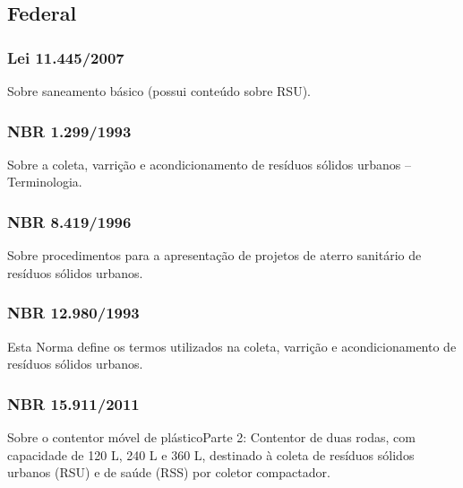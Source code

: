 \begin{subapend}
	\subsection{Federal}
	\begin{subsubapend}
		\subsubsection{Lei 11.445/2007}
		Sobre saneamento básico (possui conteúdo sobre RSU).
		\subsubsection{NBR 1.299/1993}
		Sobre a coleta, varrição e acondicionamento de resíduos sólidos urbanos – Terminologia.
		\subsubsection{NBR 8.419/1996}
		Sobre procedimentos para a apresentação de projetos de aterro sanitário de resíduos sólidos urbanos.
		\subsubsection{NBR 12.980/1993}
		Esta Norma define os termos utilizados na coleta, varrição e acondicionamento de resíduos sólidos urbanos.
		\subsubsection{NBR 15.911/2011}
		Sobre o contentor móvel de plásticoParte 2: Contentor de duas rodas, com capacidade de 120 L, 240 L e 360 L, destinado à coleta de resíduos sólidos urbanos (RSU) e de saúde (RSS) por coletor compactador.
	\end{subsubapend}
\end{subapend}


